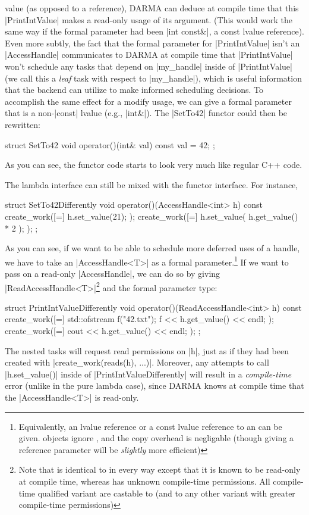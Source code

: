 value (as opposed to a reference), DARMA can deduce at compile time that this
|PrintIntValue| makes a read-only usage of its argument.  (This would work the
same way if the formal parameter had been |int const&|, a const lvalue
reference).  Even more subtly, the fact that the formal parameter for
|PrintIntValue| isn't an |AccessHandle| communicates to DARMA at compile time
that |PrintIntValue| won't schedule any tasks that depend on |my_handle| inside
of |PrintIntValue| (we call this a {\it leaf} task with respect to |my_handle|),
which is useful information that the backend can utilize to make informed
scheduling decisions.  To accomplish the same effect for a modify usage, we can
give a formal parameter that is a non-|const| lvalue (e.g., |int&|).  The
|SetTo42| functor could then be rewritten:
\begin{CppCodeNumb}
struct SetTo42 {
  void operator()(int& val) const {
    val = 42;
  }
};
\end{CppCodeNumb}
As you can see, the functor code starts to look very much like regular C++ code.

The lambda interface can still be mixed with the functor interface.  For
instance,
\begin{CppCodeNumb}
struct SetTo42Differently {
  void operator()(AccessHandle<int> h) const {
    create_work([=]{
      h.set_value(21);
    });
    create_work([=]{
      h.set_value( h.get_value() * 2 );
    });
  }
};
\end{CppCodeNumb}
As you can see, if we want to be able to schedule more deferred uses of a
handle, we have to take an |AccessHandle<T>| as a formal
parameter.\footnote{Equivalently, an lvalue reference or a const lvalue
reference to an  can be given. 
 objects ignore , and the copy
overhead is negligable (though giving a reference parameter will be {\it
slightly} more efficient)}  If we want to pass on a read-only |AccessHandle|, we
can do so by giving |ReadAccessHandle<T>|\footnote{Note that
 is identical to 
in every way except that it is known to be read-only at compile time, whereas
 has unknown compile-time permissions.  All
compile-time qualified  variant are castable to
 (and to any other 
variant with greater compile-time permissions)} and the formal parameter type:
\begin{CppCodeNumb}
struct PrintIntValueDifferently {
  void operator()(ReadAccessHandle<int> h) const {
    create_work([=]{
      std::ofstream f("42.txt");
      f << h.get_value() << endl;
    });
    create_work([=]{
      cout << h.get_value() << endl;
    });
  }
};
\end{CppCodeNumb}
The nested tasks will request read permissions on |h|, just as if they had been
created with |create_work(reads(h), ...)|.  Moreover, any attempts to call
|h.set_value()| inside of |PrintIntValueDifferently| will result in a {\it
compile-time} error (unlike in the pure lambda case), since DARMA knows at
compile time that the |AccessHandle<T>| is read-only.  

\lstDeleteShortInline{\|}